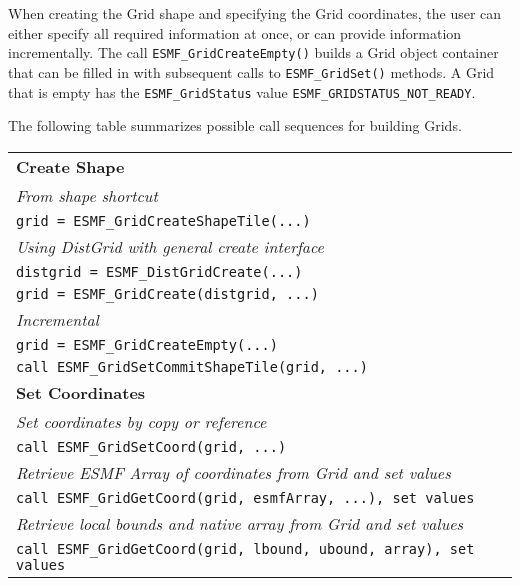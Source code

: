 When creating the Grid shape and specifying the Grid coordinates,
the user can either specify all required information at once,
or can provide information incrementally.  The call
{\tt ESMF\_GridCreateEmpty()} builds a Grid object
container that can be filled in with subsequent calls to 
{\tt ESMF\_GridSet()} methods.  A Grid that is empty
has the {\tt ESMF\_GridStatus} value
{\tt ESMF\_GRIDSTATUS\_NOT\_READY}.

The following table summarizes possible call sequences
for building Grids.

\begin{tabular}{|l|}
\hline
{\bf Create Shape} \\
{\it From shape shortcut} \\
{\tt grid = ESMF\_GridCreateShapeTile(...)} \\
{\it Using DistGrid with general create interface} \\
{\tt distgrid = ESMF\_DistGridCreate(...)} \\
{\tt grid = ESMF\_GridCreate(distgrid, ...)} \\
{\it Incremental} \\
{\tt grid = ESMF\_GridCreateEmpty(...)} \\
{\tt call ESMF\_GridSetCommitShapeTile(grid, ...)} \\ \hline
{\bf Set Coordinates} \\
{\it Set coordinates by copy or reference} \\
{\tt call ESMF\_GridSetCoord(grid, ...)} \\
{\it Retrieve ESMF Array of coordinates from Grid and set values} \\
{\tt call ESMF\_GridGetCoord(grid, esmfArray, ...), set values} \\
{\it Retrieve local bounds and native array from Grid and set values} \\
{\tt call ESMF\_GridGetCoord(grid, lbound, ubound, array), set values} \\ \hline
\end{tabular}
